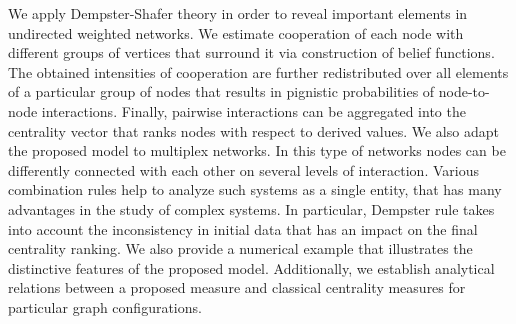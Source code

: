 
We apply Dempster-Shafer theory in order to reveal important elements in undirected weighted networks. We estimate cooperation of each node with different groups of vertices that surround it via construction of belief functions. The obtained intensities of cooperation are further redistributed over all elements of a particular group of nodes that results in pignistic probabilities of node-to-node interactions. Finally, pairwise interactions can be aggregated into the centrality vector that ranks nodes with respect to derived values. We also adapt the proposed model to multiplex networks. In this type of networks nodes can be differently connected with each other on several levels of interaction. Various combination rules help to analyze such systems as a single entity, that has many advantages in the study of complex systems. In particular, Dempster rule takes into account the inconsistency in initial data that has an impact on the final centrality ranking. We also provide a numerical example that illustrates the distinctive features of the proposed model. Additionally, we establish analytical relations between a proposed measure and classical centrality measures for particular graph configurations.


